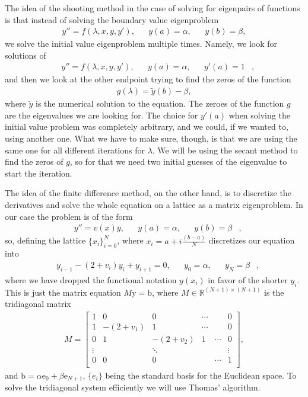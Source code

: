 \documentclass[10pt,a4paper,twocolumn]{article}
\renewcommand{\vec}[1]{\bm{\mathrm{#1}}}
\begin{document}
The idea of the shooting method in the case of solving for eigenpairs of functions is that instead of solving the boundary value eigenproblem
%
\begin{align}
    &y'' = f(\lambda, x, y, y'),& &y(a) = \alpha,& &y(b) = \beta,&
\end{align}
%
we solve the initial value eigenproblem multiple times. Namely, we look for solutions of
%
\begin{align}
    &y'' = f(\lambda, x, y, y'),& &y(a) = \alpha,& &y'(a) = 1&,
\end{align}
%
and then we look at the other endpoint trying to find the zeros of the function
%
\begin{align}
    g(\lambda) = \tilde{y}(b) - \beta,
\end{align}
%
where $\tilde{y}$ is the numerical solution to the equation. The zeroes of the function $g$ are the eigenvalues we are looking for. The choice for $y'(a)$ when solving the initial value problem was completely arbitrary, and we could, if we wanted to, using another one. What we have to make sure, though, is that we are using the same one for all different iterations for $\lambda$. We will be using the secant method to find the zeros of $g$, so for that we need two initial guesses of the eigenvalue to start the iteration.

The idea of the finite difference method, on the other hand, is to discretize the derivatives and solve the whole equation on a lattice as a matrix eigenproblem. In our case the problem is of the form
%
\begin{align}
    &y'' = v(x) y,& &y(a) = \alpha,& &y(b) = \beta&,
\end{align}
%
so, defining the lattice $\{ x_i \}_{i=0}^{N}$, where $x_i = a + i \frac{(b-a)}{N}$ discretizes our equation into
%
\begin{align}
    &y_{i-1} - (2 + v_i) y_i + y_{i+1} = 0,& &y_0=\alpha,& &y_N=\beta&,
\end{align}
%
where we have dropped the functional notation $y(x_i)$ in favor of the shorter $y_i$. This is just the matrix equation $M \vec{y} = \vec{b}$, where $M \in \mathbb{R}^{(N+1) \times (N+1)}$ is the tridiagonal matrix
%
\begin{align}
    M = 
    \begin{bmatrix}
        1 & 0 & 0 & \cdots & & 0\\
        1 & -(2 + v_1) & 1 & \cdots & & 0\\
        0 & 1 & -(2 + v_2) & 1 & \cdots & 0\\
        \vdots & & \ddots & & & \vdots\\
        0 & 0 & 0 & & \cdots & 1\\
    \end{bmatrix},
\end{align}
%
and $\vec{b} = \alpha \vec{e}_0 + \beta \vec{e}_{N+1}$, $\{ e_{i} \}$ being the standard basis for the Euclidean space. To solve the tridiagonal system efficiently we will use Thomas' algorithm.
\end{document}
